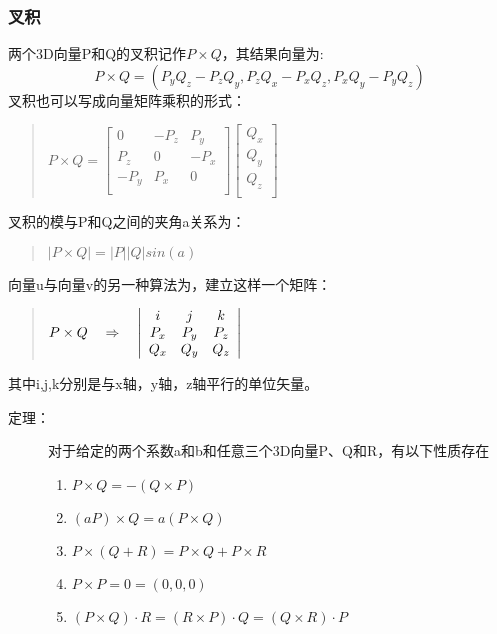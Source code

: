 \documentclass[a4paper,10pt]{article}
\begin{document}
\begin{CJK}{UTF8}{song}
\subsubsection{叉积}
两个3D向量P和Q的叉积记作$P\times{}Q$，其结果向量为:
\begin{displaymath}
P\times{}Q=(P_yQ_z-P_zQ_y,P_zQ_x-P_xQ_z,P_xQ_y-P_yQ_z)
\end{displaymath}
叉积也可以写成向量矩阵乘积的形式：
\begin{quote}
\begin{math}
P\times{}Q=
\left[\begin{array}{ccc}
0 & -P_{z}  & P_{y} \\
P_{z} & 0 & -P_{x} \\
-P_{y} & P_{x} & 0 \\
\end{array} \right]
\left[\begin{array}{c}
Q_{x} \\
Q_{y} \\
Q_{z} \\ 
\end{array}\right]
\end{math}
\end{quote}
叉积的模与P和Q之间的夹角a关系为：
\begin{quote}
$|P\times{}Q|=|P||Q|sin(a)$
\end{quote}
向量u与向量v的另一种算法为，建立这样一个矩阵： 
\begin{quote}
\begin{math}
P \times Q 
\quad\Rightarrow\quad
\left| \begin{array}{ccc}
	i & j & k \\
	P_{x} & P_{y} & P_{z} \\
	Q_{x} & Q_{y} & Q_{z} \\
       \end{array}
\right|  \\
\end{math}
\end{quote}
其中i,j,k分别是与x轴，y轴，z轴平行的单位矢量。
\begin{description}
\item[定理：]对于给定的两个系数a和b和任意三个3D向量P、Q和R，有以下性质存在
\begin{enumerate}
\item $P\times{}Q=-(Q\times{}P)$
\item $(aP)\times{}Q=a(P\times{}Q)$
\item $P\times{}(Q+R)=P\times{}Q+P\times{}R$
\item $P\times{}P=0=(0,0,0)$
\item $(P\times{}Q)\cdot{}R=(R\times{}P)\cdot{}Q=(Q\times{}R)\cdot{}P $
\end{enumerate}
\end{description}


\end{CJK}
\end{document}
